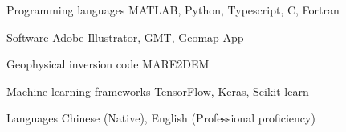 

\begin{cvskills}

  \cvskill
    {Programming languages} %
    {MATLAB, Python, Typescript, C, Fortran} %

  \cvskill
    {Software} %
    {Adobe Illustrator, GMT, Geomap App} %

  \cvskill
    {Geophysical inversion code} %
    {MARE2DEM} %

  \cvskill
    {Machine learning frameworks} %
    {TensorFlow, Keras, Scikit-learn} %

  \cvskill
    {Languages} %
    {Chinese (Native), English (Professional proficiency)} %

\end{cvskills}
